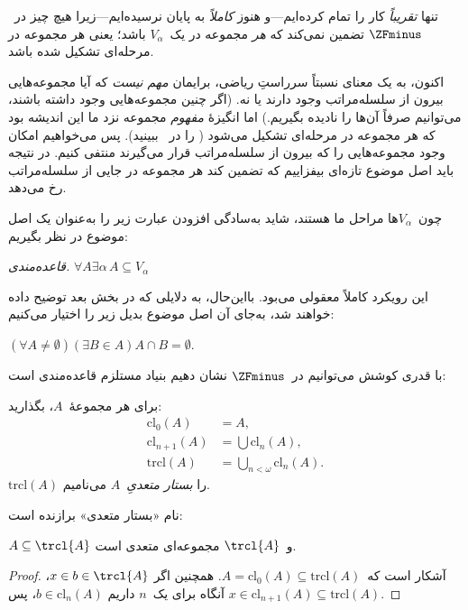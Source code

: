 \documentclass[../../../include/open-logic-section]{subfiles}
\begin{document}


تنها \emph{تقریباً} کار را تمام کرده‌ایم---و هنوز \emph{کاملاً} به پایان
نرسیده‌ایم---زیرا هیچ چیز در~$\ZFminus$ تضمین نمی‌کند که \emph{هر}
مجموعه در یک~$V_\alpha$ باشد؛ یعنی هر مجموعه در مرحله‌ای تشکیل شده باشد.

اکنون، به یک معنای نسبتاً سرراستِ ریاضی، برایمان \emph{مهم نیست} که آیا
مجموعه‌هایی بیرون از سلسله‌مراتب وجود دارند یا نه. (اگر چنین مجموعه‌هایی
وجود داشته باشند، می‌توانیم صرفاً آن‌ها را نادیده بگیریم.) اما انگیزهٔ
\emph{مفهوم} مجموعه نزد ما این اندیشه بود که هر مجموعه در مرحله‌ای تشکیل
می‌شود (\stageshier{} را در~ ببینید). پس می‌خواهیم
امکان وجود مجموعه‌هایی را که بیرون از سلسله‌مراتب قرار می‌گیرند منتفی
کنیم. در نتیجه باید اصل موضوع تازه‌ای بیفزاییم که تضمین کند هر مجموعه در
جایی از سلسله‌مراتب رخ می‌دهد.

چون~$V_\alpha$ها مراحل ما هستند، شاید به‌سادگی افزودن عبارت زیر را به‌عنوان
یک اصل موضوع در نظر بگیریم:

\begin{defish}
\emph{قاعده‌مندی.} $\forall A \exists \alpha\, A \subseteq V_\alpha$
\end{defish}

این رویکرد کاملاً معقولی می‌بود. بااین‌حال، به دلایلی که در بخش بعد
توضیح داده خواهند شد، به‌جای آن اصل موضوع بدیل زیر را اختیار می‌کنیم:

\begin{axiom}[بنیاد]
$(\forall A \neq \emptyset)(\exists B \in A)A \cap B = \emptyset$.
\end{axiom}

با قدری کوشش می‌توانیم در~$\ZFminus$ نشان دهیم بنیاد مستلزم قاعده‌مندی
است:
\begin{defn}
برای هر مجموعهٔ~$A$، بگذارید:
\begin{align*}
	\text{cl}_0(A) &= A,\\
	\text{cl}_{n+1}(A) &= \bigcup \text{cl}_n(A),\\
	\text{trcl}(A) &= \bigcup_{n < \omega} \text{cl}_{n}(A).
\end{align*}
$\text{trcl}(A)$ را \emph{بستار متعدیِ}~$A$ می‌نامیم.
\end{defn}
\noindent
نام «بستار متعدی» برازنده است:
\begin{prop}
$A\subseteq\trcl{A}$ و~$\trcl{A}$ مجموعه‌ای متعدی است.
\end{prop}

\begin{proof}
آشکار است که~$A=\text{cl}_0(A)\subseteq\text{trcl}(A)$. همچنین اگر
$x\in b\in\trcl{A}$، آنگاه برای یک~$n$ داریم
$b\in\text{cl}_n(A)$، پس
$x\in\text{cl}_{n+1}(A)\subseteq\text{trcl}(A)$.
\end{proof}
\end{document}
